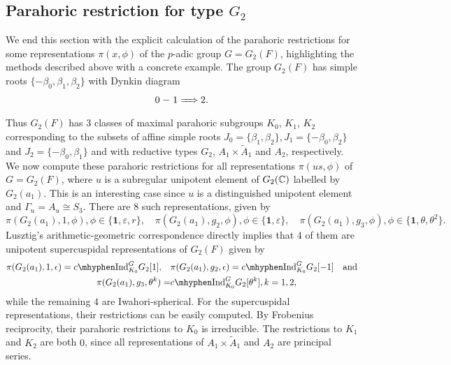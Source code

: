 \subsection{Parahoric restriction for type \texorpdfstring{$G_2$}{PDFstring}}
We end this section with the explicit calculation of the parahoric restrictions for some representations $\pi(x,\phi)$ of the $p$-adic group $G=G_2(F)$, highlighting the methods described above with a concrete example. The group $G_2(F)$ has simple roots $\{-\beta_0,\beta_1,\beta_2\}$ with Dynkin diagram 
\[
    0 \relbar 1 \xRightarrow{\quad} 2.
\]
Thus $G_2(F)$ has $3$ classes of maximal parahoric subgroups $K_0$, $K_1$, $K_2$ corresponding to the subsets of affine simple roots $J_0=\{\beta_1,\beta_2\}, J_1=\{-\beta_0,\beta_2\}$ and $J_2=\{-\beta_0,\beta_1\}$ and with reductive types $G_2$, $A_1\times \tilde{A}_1$ and $A_2$, respectively. We now compute these parahoric restrictions for all representations $\pi(us,\phi)$ of $G=G_2(F)$, where $u$ is a subregular unipotent element of $G_2(\mathbb{C})$ labelled by $G_2(a_1)$. This is an interesting case since $u$ is a distinguished unipotent element and $\Gamma_u=A_u\cong S_3$. There are $8$ such representations, given by 
$$\pi(G_2(a_1),1,\phi),\phi\in\{\mathbf{1},\varepsilon,r\},\quad\pi(G_2(a_1),g_2,\phi),\phi\in\{\mathbf{1},\varepsilon\},\quad\pi(G_2(a_1),g_3,\phi),\phi\in\{\mathbf{1},\theta,\theta^2\}.$$
Lusztig's arithmetic-geometric correspondence directly implies that $4$ of them are unipotent supercuspidal representations of $G_2(F)$ given by 
\begin{align*}
    \pi(G_2(a_1),1,\epsilon)=\cInd_{K_0}^{G}G_2[1],\quad&\pi(G_2(a_1),g_2,\epsilon)=\cInd_{K_0}^{G}G_2[-1]\quad\text{and}\\
    \quad\pi(G_2(a_1),g_3,\theta^k)=&\cInd_{K_0}^{G}G_2[\theta^k], k=1,2,
\end{align*}
while the remaining $4$ are Iwahori-spherical. 
For the supercuspidal representations, their restrictions can be easily computed. By Frobenius reciprocity, their parahoric restrictions to $K_0$ is irreducible. The restrictions to $K_1$ and $K_2$ are both $0$, since all representations of $A_1\times \tilde{A}_1$ and $A_2$ are principal series. 

